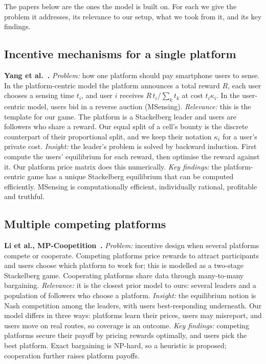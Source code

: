 \documentclass[12pt,draftcls,onecolumn]{IEEEtran}
\begin{document}
The papers below are the ones the model is built on. For each we give the problem it addresses, its relevance to our setup, what we took from it, and its key findings.

\subsection{Incentive mechanisms for a single platform}
\textbf{Yang et al.~\cite{yang2012crowdsourcing}.}
\emph{Problem:} how one platform should pay smartphone users to sense. In the platform-centric model the platform announces a total reward $R$, each user chooses a sensing time $t_i$, and user $i$ receives $R\,t_i/\sum_k t_k$ at cost $t_i\kappa_i$. In the user-centric model, users bid in a reverse auction (MSensing).
\emph{Relevance:} this is the template for our game. The platform is a Stackelberg leader and users are followers who share a reward. Our equal split of a cell's bounty is the discrete counterpart of their proportional split, and we keep their notation $\kappa_i$ for a user's private cost.
\emph{Insight:} the leader's problem is solved by backward induction. First compute the users' equilibrium for each reward, then optimise the reward against it. Our platform price matrix does this numerically.
\emph{Key findings:} the platform-centric game has a unique Stackelberg equilibrium that can be computed efficiently. MSensing is computationally efficient, individually rational, profitable and truthful.

\subsection{Multiple competing platforms}
\textbf{Li et al., MP-Coopetition~\cite{li2021mp}.}
\emph{Problem:} incentive design when several platforms compete or cooperate. Competing platforms price rewards to attract participants and users choose which platform to work for; this is modelled as a two-stage Stackelberg game. Cooperating platforms share data through many-to-many bargaining.
\emph{Relevance:} it is the closest prior model to ours: several leaders and a population of followers who choose a platform.
\emph{Insight:} the equilibrium notion is Nash competition among the leaders, with users best-responding underneath. Our model differs in three ways: platforms learn their prices, users may misreport, and users move on real routes, so coverage is an outcome.
\emph{Key findings:} competing platforms secure their payoff by pricing rewards optimally, and users pick the best platform. Exact bargaining is NP-hard, so a heuristic is proposed; cooperation further raises platform payoffs.
\end{document}
